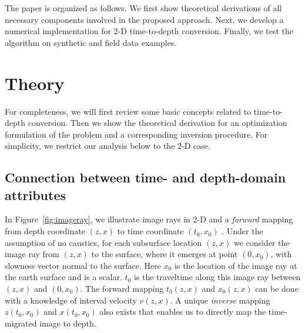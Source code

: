 The paper is organized as follows. We first show theoretical derivations of all 
necessary components involved in the proposed approach. Next, we develop a numerical implementation 
for 2-D time-to-depth conversion. Finally, we test the algorithm on synthetic and field data examples. 

\section{Theory}

For completeness, we will first review some basic concepts related to time-to-depth conversion. Then we show 
the theoretical derivation for an optimization formulation of the problem and a corresponding inversion 
procedure. For simplicity, we restrict our analysis below to the 2-D case.

\subsection{Connection between time- and depth-domain attributes}

In Figure~\ref{fig:imageray}, we illustrate image rays in 2-D and a \textit{forward} mapping from depth coordinate 
$(z,x)$ to time coordinate $(t_0,x_0)$ \cite[]{hubral}.  Under the 
assumption of no caustics, for each subsurface location $(z,x)$ we consider the image ray from $(z,x)$ to the 
surface, where it emerges at point $(0,x_0)$, with slowness vector normal to the surface. Here $x_0$ is the 
location of the image ray at the earth surface and is a scalar. $t_0$ is the traveltime along this image ray between 
$(z,x)$ and $(0,x_0)$. The forward mapping $t_0 (z,x)$ and $x_0 (z,x)$ can be done with a knowledge of interval 
velocity $v (z,x)$. A unique \textit{inverse} mapping $z (t_0,x_0)$ and $x (t_0,x_0)$ also exists that enables 
us to directly map the time-migrated image to depth.

